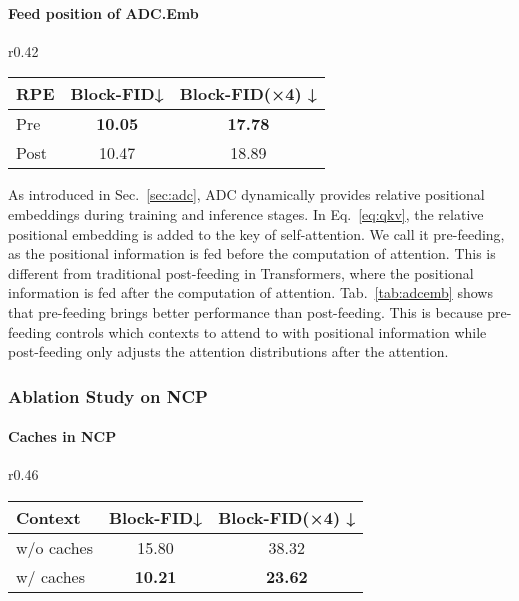 \documentclass{article}
\begin{document}
\paragraph{Feed position of ADC.Emb} 
\begin{wraptable}[6]{r}{0.42\textwidth}
\vspace{-0.25in}
\centering
\vskip 0.1in
\setlength{\tabcolsep}{2.5pt}
\begin{tabular}{lcc}
    \toprule
    RPE  & Block-FID↓ & Block-FID(×4) ↓ \\ \hline
Pre  & \textbf{10.05}      & \textbf{17.78}         \\
    Post & 10.47      & 18.89  \\  
    \bottomrule
    \end{tabular}
\caption{Impact of feed position.}
 \label{tab:adcemb}
\end{wraptable}
As introduced in Sec.~\ref{sec:adc}, ADC dynamically provides relative positional embeddings during training and inference stages. In Eq.~\ref{eq:qkv}, the relative positional embedding  is added to the key of self-attention. We call it pre-feeding, as the positional information is fed before the computation of attention. This is different from traditional post-feeding in Transformers, where the positional information is fed after the computation of attention. Tab.~\ref{tab:adcemb} shows that pre-feeding brings better performance than post-feeding. This is because pre-feeding controls which contexts to attend to with positional information while post-feeding only adjusts the attention distributions after the attention. 

















\subsubsection{Ablation Study on NCP}

\paragraph{Caches in NCP}
\begin{wraptable}[7]{r}{0.46\textwidth}
\vspace{-0.16in}
\centering
\setlength{\tabcolsep}{2pt}
\begin{tabular}{lcc}
\toprule
Context      & Block-FID↓ & Block-FID(×4) ↓ \\ 
\midrule
w/o caches & 15.80       & 38.32           \\
w/ caches  & \textbf{10.21}      & \textbf{23.62} \\
\bottomrule
\end{tabular}
\caption{Ablation results in caches in NCP.}
\label{tab:transfer}
\end{wraptable}
\end{document}
